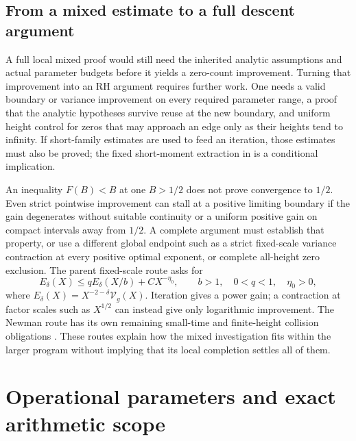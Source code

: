 \documentclass[11pt]{article}
\theoremstyle{definition}
\begin{document}
\subsection{From a mixed estimate to a full descent argument}
A full local mixed proof would still need the inherited analytic assumptions and actual parameter budgets before it yields a zero-count improvement. Turning that improvement into an RH argument requires further work. One needs a valid boundary or variance improvement on every required parameter range, a proof that the analytic hypotheses survive reuse at the new boundary, and uniform height control for zeros that may approach an edge only as their heights tend to infinity. If short-family estimates are used to feed an iteration, those estimates must also be proved; the fixed short-moment extraction in \cite{sf} is a conditional implication.

An inequality $F(B)<B$ at one $B>1/2$ does not prove convergence to $1/2$. Even strict pointwise improvement can stall at a positive limiting boundary if the gain degenerates without suitable continuity or a uniform positive gain on compact intervals away from $1/2$. A complete argument must establish that property, or use a different global endpoint such as a strict fixed-scale variance contraction at every positive optimal exponent, or complete all-height zero exclusion. The parent fixed-scale route asks for
\[
 E_\delta(X)\le qE_\delta(X/b)+CX^{-\eta_0},\qquad
 b>1,\quad 0<q<1,\quad \eta_0>0,
\]
where $E_\delta(X)=X^{-2-\delta}\mathcal V_g(X)$. Iteration gives a power gain; a contraction at factor scales such as $X^{1/2}$ can instead give only logarithmic improvement. The Newman route has its own remaining small-time and finite-height collision obligations \cite{continuation,overview}. These routes explain how the mixed investigation fits within the larger program without implying that its local completion settles all of them.

\appendix
\section{Operational parameters and exact arithmetic scope}\label{app-parameters}
\end{document}
